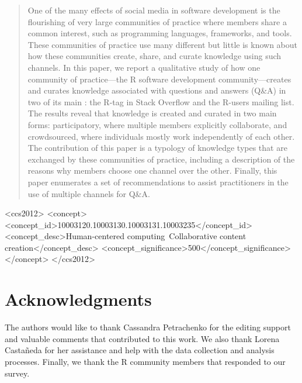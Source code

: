 \documentclass{sig-alternate-05-2015}
\begin{document}
\date{\the\year}

\maketitle

\begin{abstract}
One of the many effects of social media in software development is the flourishing of very large communities of practice where members share a common interest, such as programming languages, frameworks, and tools. These communities of practice use many different \channels but little is known about how these communities create, share, and curate knowledge using such channels.
%
In this paper, we report a qualitative study of how one community of practice---the R software development community---creates and curates knowledge associated with questions and answers (Q\&A) in two of its main \channels: the R-tag in Stack Overflow and the R-users mailing list. The results reveal that knowledge is created and curated in two main forms: participatory, where multiple members explicitly collaborate, and crowdsourced, where individuals mostly work independently of each other. The contribution of this paper is a typology of knowledge types that are exchanged by these communities of practice, including a description of the reasons why members choose one channel over the other.  Finally, this paper enumerates a set of recommendations to assist practitioners in the use of multiple channels for Q\&A. 

\end{abstract}

%
%
\begin{CCSXML}
<ccs2012>
<concept>
<concept_id>10003120.10003130.10003131.10003235</concept_id>
<concept_desc>Human-centered computing~Collaborative content creation</concept_desc>
<concept_significance>500</concept_significance>
</concept>
</ccs2012>
\end{CCSXML}


%
%

%
%
\printccsdesc

\keywords{\mykeywords}



%





\section{Acknowledgments}
The authors would like to thank Cassandra Petrachenko for the editing support and valuable comments that contributed to this work. We also thank Lorena Castañeda for her assistance and help with the data collection and analysis processes.  Finally, we thank the R community members that responded to our survey.



\end{document}
